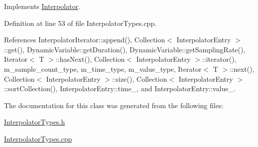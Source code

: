 Implements \hyperlink{classInterpolator_a3}{Interpolator}.

Definition at line 53 of file Interpolator\-Types.cpp.

References Interpolator\-Iterator::append(), Collection$<$ Interpolator\-Entry $>$::get(), Dynamic\-Variable::get\-Duration(), Dynamic\-Variable::get\-Sampling\-Rate(), Iterator$<$ T $>$::has\-Next(), Collection$<$ Interpolator\-Entry $>$::iterator(), m\_\-sample\_\-count\_\-type, m\_\-time\_\-type, m\_\-value\_\-type, Iterator$<$ T $>$::next(), Collection$<$ Interpolator\-Entry $>$::size(), Collection$<$ Interpolator\-Entry $>$::sort\-Collection(), Interpolator\-Entry::time\_\-, and Interpolator\-Entry::value\_\-.

The documentation for this class was generated from the following files:\begin{CompactItemize}
\item 
\hyperlink{InterpolatorTypes_8h}{Interpolator\-Types.h}\item 
\hyperlink{InterpolatorTypes_8cpp}{Interpolator\-Types.cpp}\end{CompactItemize}
